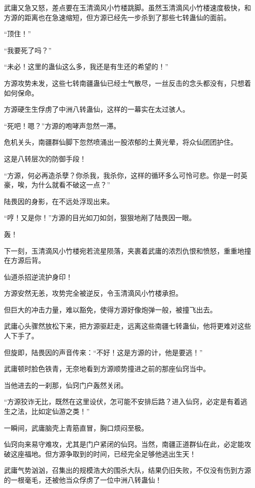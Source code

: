 \begin{this_body}
武庸又急又怒，差点要在玉清滴风小竹楼跳脚。虽然玉清滴风小竹楼速度极快，和方源的距离也在急速缩短，但方源已经先一步杀到了那些七转蛊仙的面前。

“顶住！”

“我要死了吗？”

“未必！这里的蛊仙这么多，我还是有生还的希望的！”

方源攻势未发，这些七转南疆蛊仙已经士气散尽，一丝反击的念头都没有，只想着如何保命。

方源硬生生俘虏了中洲八转蛊仙，这样的一幕实在太过骇人。

“死吧！嗯？”方源的咆哮声忽然一滞。

危机关头，南疆群仙脚下忽然喷涌出一股浓郁的土黄光晕，将众仙团团护住。

这是八转层次的防御手段！

“方源，何必再造杀孽？你杀我，我杀你，这样的循环多么可怜可悲。你是一时英豪，唉，为什么就看不破这一点？”

陆畏因的身影，在不远处浮现出来。

“哼！又是你！”方源的目光如刀如剑，狠狠地剐了陆畏因一眼。

轰！

下一刻，玉清滴风小竹楼宛若流星陨落，夹裹着武庸的浓烈仇恨和愤怒，重重地撞在方源后背。

仙道杀招逆流护身印！

方源安然无恙，攻势完全被逆反，令玉清滴风小竹楼承担。

但巨大的冲击力量，难以豁免，使得方源好像炮弹一般，被撞飞出去。

武庸心头骤然放松下来，把方源驱赶走，远离这些南疆七转蛊仙，他将更难对这些人下手了。

但旋即，陆畏因的声音传来：“不好！这是方源的计，他是要逃！”

武庸顿时脸色铁青，无奈地看到方源顺势撞进之前的那座仙窍当中。

当他进去的一刹那，仙窍门户轰然关闭。

“方源狡诈无比，既然在这里设伏，怎可能不安排后路？进入仙窍，必定是有着逃生之法，比如定仙游之类！”

一瞬间，武庸脑壳上青筋直冒，胸口烦闷至极。

仙窍向来易守难攻，尤其是门户紧闭的仙窍。当然，南疆正道群仙在此，必定能攻破这座福地。但方源争取到的时间，已经完全足够他逃出生天！

武庸气势汹汹，召集出的规模浩大的围杀大队，结果仍旧失败，不仅没有伤到方源的一根毫毛，还被他当众俘虏了一位中洲八转蛊仙！


\end{this_body}
